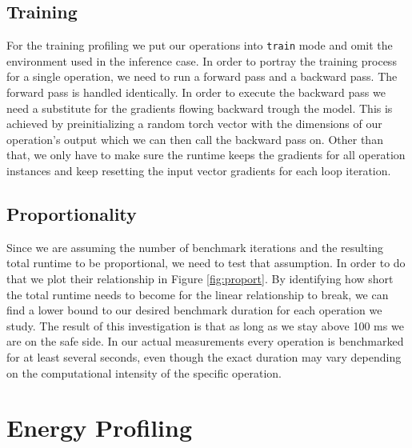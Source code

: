 \subsection{Training}
For the training profiling we put our operations into \texttt{train} mode and omit the environment used in the inference case. In order to portray the training process for a single operation, we need to run a forward pass and a backward pass. The forward pass is handled identically. In order to execute the backward pass we need a substitute for the gradients flowing backward trough the model. This is achieved by preinitializing a random torch vector with the dimensions of our operation's output which we can then call the backward pass on. Other than that, we only have to make sure the runtime keeps the gradients for all operation instances and keep resetting the input vector gradients for each loop iteration.

\subsection{Proportionality}
Since we are assuming the number of benchmark iterations and the resulting total runtime to be proportional, we need to test that assumption. In order to do that we plot their relationship in Figure \ref{fig:proport}. By identifying how short the total runtime needs to become for the linear relationship to break, we can find a lower bound to our desired benchmark duration for each operation we study. The result of this investigation is that as long as we stay above 100 ms we are on the safe side. In our actual measurements every operation is benchmarked for at least several seconds, even though the exact duration may vary depending on the computational intensity of the specific operation.


\section{Energy Profiling}



